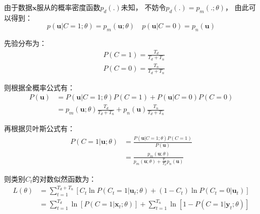 由于数据$\mathbf{x}$服从的概率密度函数$p_d\left(.\right)$未知，
不妨令$p_d\left(.\right)=p_m\left(.;\theta\right)$，
由此可以得到：
\begin{equation}
    p\left(\mathbf{u}|C=1;\theta\right) = p_m\left(\mathbf{u};\theta\right) \quad p\left(\mathbf{u}|C=0\right)=p_n\left(\mathbf{u}\right)
\end{equation}

先验分布为：
\begin{equation}
    \begin{aligned}
        &P\left(C=1\right)=\frac{T_d}{T_d+T_n}\\
        &P\left(C=0\right)=\frac{T_n}{T_d+T_n}
    \end{aligned}
\end{equation}

则根据全概率公式有：
\begin{equation}
    \begin{aligned}
        P\left(\mathbf{u}\right)&=P\left(\mathbf{u}|C=1;\theta\right)P\left(C=1\right)+P\left(\mathbf{u}|C=0\right)P\left(C=0\right)\\
        &=p_m\left(\mathbf{u};\theta\right)\frac{T_d}{T_d+T_n}+p_n\left(\mathbf{u}\right)\frac{T_n}{T_d+T_n}
    \end{aligned}
\end{equation}

再根据贝叶斯公式有：
\begin{equation}
    \begin{aligned}
        P\left(C=1|\mathbf{u};\theta\right)&=\frac{P\left(\mathbf{u}|C=1;\theta\right)P\left(C=1\right)}{P\left(\mathbf{u}\right)}\\
        &=\frac{p_m\left(\mathbf{u};\theta\right)}{p_m\left(\mathbf{u};\theta\right)+\frac{T_n}{T_d}p_n\left(\mathbf{u}\right)}
    \end{aligned}
\end{equation}

则类别$C_t$的对数似然函数为：
\begin{equation}
    \label{eq:C_tL}
    \begin{aligned}
        L\left(\theta\right)&=\sum_{t=1}^{T_d+T_n}\left[C_t\ln P\left(C_t=1|\mathbf{u}_t;\theta\right)+\left(1-C_t\right)\ln P\left(C_t=0|\mathbf{u}_t\right)\right]\\
        &=\sum_{t=1}^{T_d}\ln\left[P\left(C=1|\mathbf{x}_t;\theta\right)\right]+\sum_{t=1}^{T_n}\ln\left[1-P\left(C=1|\mathbf{y}_t;\theta\right)\right]
    \end{aligned}
\end{equation}

